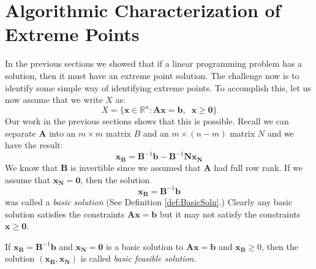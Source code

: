 \section{Algorithmic Characterization of Extreme Points}
In the previous sections we showed that if a linear programming problem has a solution, then it must have an extreme point solution. The challenge now is to identify some simple way of identifying extreme points. To accomplish this, let us now assume that we write $X$ as:
\begin{equation}
X = \{\mathbf{x} \in \mathbb{R}^n : \mathbf{A}\mathbf{x} = \mathbf{b},\;\;\mathbf{x} \geq \mathbf{0}\}
\end{equation}
Our work in the previous sections shows that this is possible. Recall we can separate $\mathbf{A}$ into an $m\times m$ matrix $B$ and an $m \times (n-m)$ matrix $N$ and we have the result:
\begin{equation}
\mathbf{x}_\mathbf{B} = \mathbf{B}^{-1}\mathbf{b} - \mathbf{B}^{-1}\mathbf{N}\mathbf{x}_\mathbf{N}
\label{eqn:BasicVars2}
\end{equation}
We know that $\mathbf{B}$ is invertible since we assumed that $\mathbf{A}$ had full row rank. If we assume that $\mathbf{x}_\mathbf{N} = \mathbf{0}$, then the solution
\begin{equation}
\mathbf{x}_\mathbf{B} = \mathbf{B}^{-1}\mathbf{b}
\end{equation}
was called a \textit{basic solution} (See Definition \ref{def:BasicSoln}.) Clearly any basic solution satisfies the constraints $\mathbf{A}\mathbf{x} = \mathbf{b}$ but it may not satisfy the constraints $\mathbf{x} \geq \mathbf{0}$. 

\begin{definition} If $\mathbf{x}_\mathbf{B} = \mathbf{B}^{-1}\mathbf{b}$ and $\mathbf{x}_\mathbf{N} = \mathbf{0}$ is a basic solution to $\mathbf{A}\mathbf{x} = \mathbf{b}$ and $\mathbf{x}_\mathbf{B} \geq 0$, then the solution $(\mathbf{x}_\mathbf{B},\mathbf{x}_\mathbf{N})$ is called \textit{basic feasible solution}.
\end{definition}

